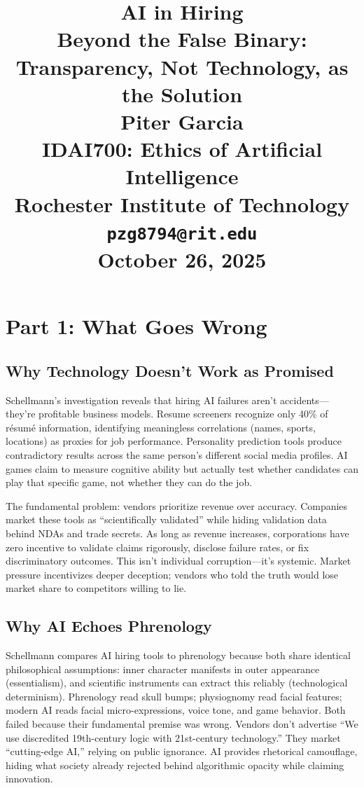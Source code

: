 \documentclass[11pt,twoside]{article}
\title{
\vspace*{2in}
\textbf{\Huge AI in Hiring}\\[1em]
\LARGE Beyond the False Binary: Transparency, Not Technology, as the Solution\\[2em]

\vfill
\Huge \textbf{Piter Garcia}\\
\LARGE IDAI700: Ethics of Artificial Intelligence\\
Rochester Institute of Technology\\
\texttt{pzg8794@rit.edu}\\

\vfill
\Huge \textbf{October 26, 2025}
}
\author{}
\date{}
\begin{document}
\thispagestyle{empty}
\maketitle
\newpage

\pagestyle{fancy}
\newpage

\section{Part 1: What Goes Wrong}

\subsection{Why Technology Doesn't Work as Promised}

Schellmann's investigation reveals that hiring AI failures aren't accidents—they're profitable business models. Resume screeners recognize only 40\% of résumé information, identifying meaningless correlations (names, sports, locations) as proxies for job performance. Personality prediction tools produce contradictory results across the same person's different social media profiles. AI games claim to measure cognitive ability but actually test whether candidates can play that specific game, not whether they can do the job.

The fundamental problem: vendors prioritize revenue over accuracy. Companies market these tools as \enquote{scientifically validated} while hiding validation data behind NDAs and trade secrets. As long as revenue increases, corporations have zero incentive to validate claims rigorously, disclose failure rates, or fix discriminatory outcomes. This isn't individual corruption—it's systemic. Market pressure incentivizes deeper deception; vendors who told the truth would lose market share to competitors willing to lie.

\subsection{Why AI Echoes Phrenology}

Schellmann compares AI hiring tools to phrenology because both share identical philosophical assumptions: inner character manifests in outer appearance (essentialism), and scientific instruments can extract this reliably (technological determinism). Phrenology read skull bumps; physiognomy read facial features; modern AI reads facial micro-expressions, voice tone, and game behavior. Both failed because their fundamental premise was wrong. Vendors don't advertise \enquote{We use discredited 19th-century logic with 21st-century technology.} They market \enquote{cutting-edge AI,} relying on public ignorance. AI provides rhetorical camouflage, hiding what society already rejected behind algorithmic opacity while claiming innovation.
\end{document}
